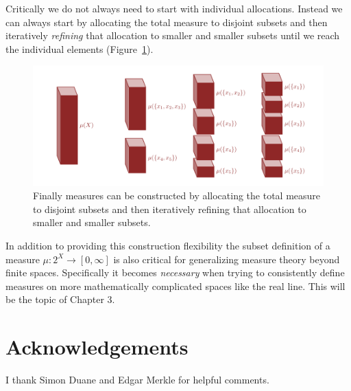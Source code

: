 \documentclass[
  letterpaper,
  DIV=11,
  numbers=noendperiod]{scrartcl}
\begin{document}
Critically we do not always need to start with individual allocations.
Instead we can always start by allocating the total measure to disjoint
subsets and then iteratively \emph{refining} that allocation to smaller
and smaller subsets until we reach the individual elements
(Figure~\ref{fig-refinement}).

\begin{figure}

{\centering \includegraphics[width=1\textwidth,height=\textheight]{figures/decompositions/refinement/refinement.pdf}

}

\caption{\label{fig-refinement}Finally measures can be constructed by
allocating the total measure to disjoint subsets and then iteratively
refining that allocation to smaller and smaller subsets.}

\end{figure}

In addition to providing this construction flexibility the subset
definition of a measure \(\mu : 2^{X} \rightarrow [0, \infty]\) is also
critical for generalizing measure theory beyond finite spaces.
Specifically it becomes \emph{necessary} when trying to consistently
define measures on more mathematically complicated spaces like the real
line. This will be the topic of Chapter 3.

\hypertarget{acknowledgements}{%
\section{Acknowledgements}\label{acknowledgements}}

I thank Simon Duane and Edgar Merkle for helpful comments.
\end{document}
